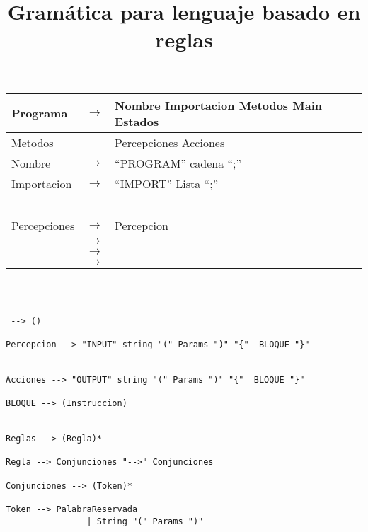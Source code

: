 \documentclass[a4,12pt]{article}
\author{}
\title{Gramática para lenguaje basado en reglas}
\begin{document}
\maketitle

\noindent
\begin{tabular}{|lcl|}
\hline
Programa   & $\to$  &  Nombre Importacion Metodos Main Estados\\

\hline
Metodos & & Percepciones Acciones\\
\hline
Nombre   & $\to$  & ``PROGRAM'' cadena ``;'' \\
\hline
Importacion   & $\to$  &  ``IMPORT'' Lista ``;''\\
   &  & \\
   &  & \\
   &  & \\
   &  & \\
   &  & \\
\hline
Percepciones   & $\to$  & Percepcion\\
   & $\to$  & \\
   & $\to$  & \\
   & $\to$  & \\
\end{tabular}


\begin{lstlisting}



 --> ()

Percepcion --> "INPUT" string "(" Params ")" "{"  BLOQUE "}"


Acciones --> "OUTPUT" string "(" Params ")" "{"  BLOQUE "}"

BLOQUE --> (Instruccion)


Reglas --> (Regla)*

Regla --> Conjunciones "-->" Conjunciones

Conjunciones --> (Token)*

Token --> PalabraReservada
				| String "(" Params ")"




\end{lstlisting}
\end{document}
